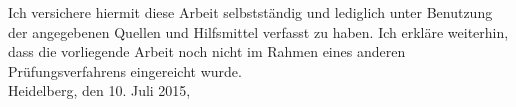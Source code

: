 
Ich versichere hiermit diese Arbeit selbstständig und lediglich unter Benutzung der angegebenen Quellen und Hilfsmittel verfasst zu haben. Ich erkläre weiterhin, dass die vorliegende Arbeit noch nicht im Rahmen eines anderen Prüfungsverfahrens eingereicht wurde.\\

Heidelberg, den 10. Juli 2015,

